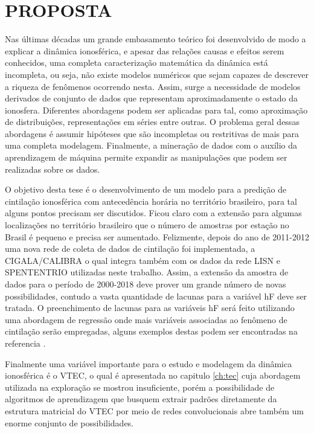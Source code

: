 \chapter{PROPOSTA}

Nas últimas décadas um grande embasamento teórico foi desenvolvido de modo a explicar a dinâmica ionosférica, e apesar das relações causas e efeitos serem conhecidos, uma completa caracterização matemática da dinâmica está incompleta, ou seja, não existe modelos numéricos que sejam capazes de descrever a riqueza de fenômenos ocorrendo nesta. Assim, surge a necessidade de modelos derivados de conjunto de dados que representam aproximadamente o estado da ionosfera. Diferentes abordagens podem ser aplicadas para tal, como aproximação de distribuições, representações em séries entre outras. O problema geral dessas abordagens é assumir hipóteses que são incompletas ou restritivas de mais para uma completa modelagem. Finalmente, a mineração de dados com o auxílio da aprendizagem de máquina permite expandir as manipulações que podem ser realizadas sobre os dados.

O objetivo desta tese é o desenvolvimento de um modelo para a predição de cintilação ionosférica com antecedência horária no território brasileiro, para tal alguns pontos precisam ser discutidos. Ficou claro com a extensão para algumas localizações no território brasileiro que o número de amostras por estação no Brasil é pequeno e precisa ser aumentado. Felizmente, depois do ano de 2011-2012 uma nova rede de coleta de dados de cintilação foi implementada, a CIGALA/CALIBRA \cite{VANI:2017} o qual integra também com os dados da rede LISN e SPENTENTRIO utilizadas neste trabalho. Assim, a extensão da amostra de dados para o período de 2000-2018 deve prover um grande número de novas possibilidades, contudo a vasta quantidade de lacunas para a variável hF deve ser tratada. O preenchimento de lacunas para as variáveis hF será feito utilizando uma abordagem de regressão onde mais variáveis associadas ao fenômeno de cintilação serão empregadas, alguns exemplos destas podem ser encontradas na referencia \cite{MCGRANAGHAN:2018}.

Finalmente uma variável importante para o estudo e modelagem da dinâmica ionosférica é o VTEC, o qual é apresentada no capitulo \ref{ch:tec} cuja abordagem utilizada na exploração se mostrou insuficiente, porém a possibilidade de algoritmos de aprendizagem que busquem extrair padrões diretamente da estrutura matricial do VTEC por meio de redes convolucionais abre também um enorme conjunto de possibilidades.

